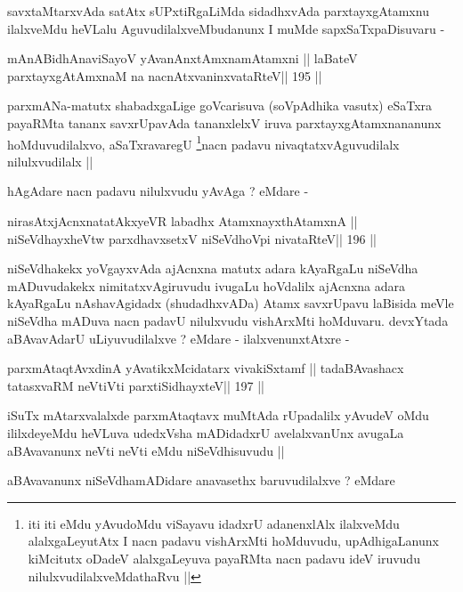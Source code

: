 \begin{artha}
savxtaMtarxvAda satAtx sUPxtiRgaLiMda sidadhxvAda parxtayxgAtamxnu
ilalxveMdu heVLalu AguvudilalxveMbudanunx I muMde sapxSaTxpaDisuvaru -
\end{artha}

\begin{shl}
mAnABidhAnaviSayoV yAvanAnx\s\s tAmxnamAtamxni ||
laBateV parxtayxgAtAmxnaM na nacnAtxvaninxvataRteV\hfill || 195 ||
\end{shl}

\begin{artha}
parxmANa-matutx shabadxgaLige goVcarisuva (soVpAdhika vasutx) eSaTxra
payaRMta tananx savxrUpavAda tananxlelxV iruva parxtayxgAtamxnananunx
hoMduvudilalxvo, aSaTxravaregU \footnote[2]{iti iti eMdu yAvudoMdu
  viSayavu idadxrU adanenxlAlx ilalxveMdu alalxgaLeyutAtx I nacn
  padavu vishArxMti hoMduvudu, upAdhigaLanunx kiMcitutx oDadeV
  alalxgaLeyuva payaRMta nacn padavu ideV iruvudu
  nilulxvudilalxveMdathaRvu ||}nacn padavu
nivaqtatxvAguvudilalx nilulxvudilalx ||

hAgAdare nacn padavu nilulxvudu yAvAga ? eMdare -
\end{artha}

\begin{shl}
nirasAtxjAcnxnatatAkxyeVR labadhx AtamxnayxthA\s\s tamxnA ||
niSeVdhayxheVtw parxdhavxsetxV niSeVdhoV\s pi nivataRteV\hfill || 196 ||
\end{shl}

\begin{artha}
niSeVdhakekx yoVgayxvAda ajAcnxna matutx adara kAyaRgaLu niSeVdha
mADuvudakekx nimitatxvAgiruvudu ivugaLu hoVdalilx ajAcnxna adara
kAyaRgaLu nAshavAgidadx (shudadhxvADa) Atamx savxrUpavu laBisida meVle
niSeVdha mADuva nacn padavU nilulxvudu vishArxMti hoMduvaru. devxYtada
aBAvavAdarU uLiyuvudilalxve ? eMdare - ilalxvenunxtAtxre -
\end{artha}

\begin{shl}
parxmAtaqtAvxdinA yAvatikxMcidatarx vivakiSxtamf ||
tadaBAvashacx tatasxvaRM neVtiVti parxtiSidhayxteV\hfill || 197 ||
\end{shl}

\begin{artha}
iSuTx mAtarxvalalxde parxmAtaqtavx muMtAda rUpadalilx yAvudeV oMdu
ililxdeyeMdu heVLuva udedxVsha mADidadxrU avelalxvanUnx avugaLa
aBAvavanunx neVti neVti eMdu niSeVdhisuvudu ||

aBAvavanunx niSeVdhamADidare anavasethx baruvudilalxve ? eMdare
\end{artha}

